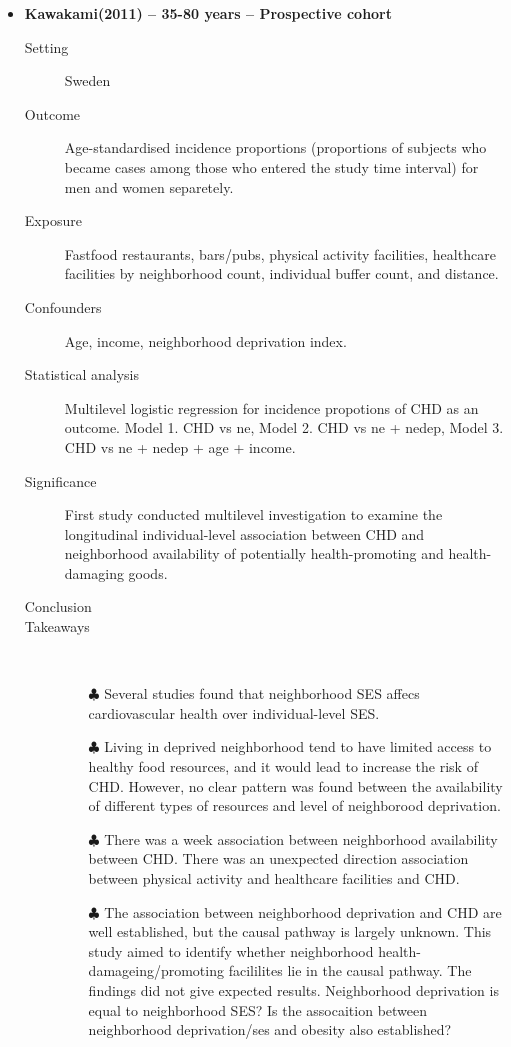 \documentclass{article}
\begin{document}
\begin{itemize}
\begin{description}
		\end{description}
		
	\vspace{5mm}
\item{\bf Kawakami(2011) -- 35-80 years  -- Prospective cohort} 
		\begin{description}
			\item[Setting] Sweden
			\item[Outcome] Age-standardised incidence proportions (proportions of subjects who became cases among those who entered the study time interval) for men and women separetely. 
			\item[Exposure] Fastfood restaurants, bars/pubs, physical activity facilities, healthcare facilities by neighborhood count, individual buffer count, and distance. 
			\item[Confounders] Age, income, neighborhood deprivation index. 
			\item[Statistical analysis] Multilevel logistic regression for incidence propotions of CHD as an outcome. Model 1. CHD vs ne, Model 2. CHD vs ne + nedep, Model 3. CHD vs ne + nedep + age + income.  
			\item[Significance] First study conducted multilevel investigation to examine the longitudinal individual-level association between CHD and neighborhood availability of potentially health-promoting and health-damaging goods. 
			\item[Conclusion] 
			\item[Takeaways] \mbox{}\\
				\begin{itemize}
					\item[$\clubsuit$] Several studies found that neighborhood SES affecs cardiovascular health over individual-level SES.
					\item[$\clubsuit$] Living in deprived neighborhood tend to have limited access to healthy food resources, and it would lead to increase the risk of CHD. However, no clear pattern was found between the availability of different types of resources and level of neighborood deprivation. 
					\item[$\clubsuit$] There was a week association between neighborhood availability between CHD. There was an unexpected direction association between physical activity and healthcare facilities and CHD. 
					\item[$\clubsuit$] The association between neighborhood deprivation and CHD are well established, but the causal pathway is largely unknown. This study aimed to identify whether neighborhood health-damageing/promoting facililites lie in the causal pathway. The findings did not give expected results. Neighborhood deprivation is equal to neighborhood SES? Is the assocaition between neighborhood deprivation/ses and obesity also established? 
				\end{itemize} 
			

\end{description}
\end{itemize}
\end{document}
